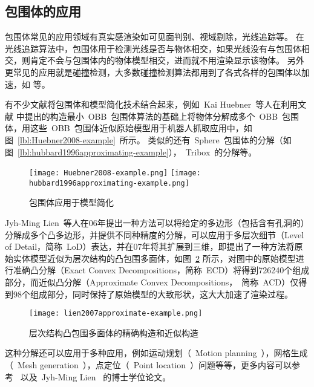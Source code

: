 \subsection{包围体的应用}
\label{subsec:bv:application}

包围体常见的应用领域有真实感渲染如可见面判别、视域剔除\cite{assarsson2000optimized}，光线追踪\cite{wald2007ray}等。
在光线追踪算法中，包围体用于检测光线是否与物体相交，如果光线没有与包围体相交，则肯定不会与包围体内的物体模型相交，进而就不用渲染显示该物体。
另外更常见的应用就是碰撞检测\cite{wangzhiqiang1999}，大多数碰撞检测算法都用到了各式各样的包围体以加速，如
 等。

有不少文献将包围体和模型简化技术结合起来，例如~Kai Huebner~等人\cite{huebner2008minimum}在利用文献
中提出的构造最小~OBB~包围体算法的基础上将物体分解成多个~OBB~包围体，用这些~OBB~包围体近似原始模型用于机器人抓取应用中，如图~\ref{lbl:Huebner2008-example}~所示。
类似的还有~Sphere~包围体的分解\cite{hubbard1996approximating}（如图~\ref{lbl:hubbard1996approximating-example}），~Tribox~的分解\cite{crosnier1999tribox}等。
\begin{figure}[H]
  \centering
    {\texttt{[image: Huebner2008-example.png]}}
    {\texttt{[image: hubbard1996approximating-example.png]}}
  \caption{包围体应用于模型简化}
  \label{lbl:bounding-voluems-used-in-shape-approximation}
\end{figure}
Jyh-Ming Lien~\cite{lien2006approximate2d}等人在06年提出一种方法可以将给定的多边形（包括含有孔洞的）分解成多个凸多边形，并提供不同种精度的分解，可以应用于多层次细节（Level of
Detail，简称~LoD）表达，并在07年将其扩展到三维\cite{lien2007approximate3d}，即提出了一种方法将原始实体模型近似为层次结构的凸包围多面体，如图~\ref{lbl:lien2007approximate-example}
所示，对图中的原始模型进行准确凸分解（Exact Convex
Decompositions，简称~ECD）将得到726240个组成部分，而近似凸分解（Approximate Convex
Decompositions，~简称~ACD）仅得到98个组成部分，同时保持了原始模型的大致形状，这大大加速了渲染过程。
\begin{figure}[H]
\centering
\texttt{[image: lien2007approximate-example.png]}
\caption{层次结构凸包围多面体的精确构造和近似构造\cite{lien2007approximate3d}}
\label{lbl:lien2007approximate-example}
\end{figure}
这种分解还可以应用于多种应用，例如运动规划（~Motion planning~），网格生成（~Mesh generation~），点定位（~Point location~）问题等等，更多内容可以参考~ 以及~Jyh-Ming Lien~ 的博士学位论文\cite{lien2006approximatephd}。

